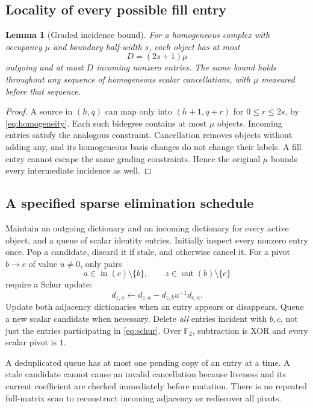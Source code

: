 \documentclass[11pt,letterpaper]{article}
\newtheorem{lemma}[theorem]{Lemma}
\theoremstyle{remark}\newtheorem{remark}[theorem]{Remark}
\newcommand{\F}{\mathbb F}
\begin{document}
\subsection{Locality of every possible fill entry}
\begin{lemma}[Graded incidence bound]\label{lem:incidence}
For a homogeneous complex with occupancy $\mu$ and boundary half-width $s$, each object has at most
\begin{equation}\label{eq:D}
 D=(2s+1)\mu
\end{equation}
outgoing and at most $D$ incoming nonzero entries. The same bound holds throughout any sequence of homogeneous scalar cancellations, with $\mu$ measured before that sequence.
\end{lemma}
\begin{proof}
A source in $(h,q)$ can map only into $(h+1,q+r)$ for $0\le r\le2s$, by \eqref{eq:homogeneity}. Each such bidegree contains at most $\mu$ objects. Incoming entries satisfy the analogous constraint. Cancellation removes objects without adding any, and its homogeneous basis changes do not change their labels. A fill entry cannot escape the same grading constraints. Hence the original $\mu$ bounds every intermediate incidence as well.
\end{proof}

\subsection{A specified sparse elimination schedule}
Maintain an outgoing dictionary and an incoming dictionary for every active object, and a queue of scalar identity entries. Initially inspect every nonzero entry once. Pop a candidate, discard it if stale, and otherwise cancel it. For a pivot $b\to c$ of value $u\ne0$, only pairs
\[
 a\in\operatorname{in}(c)\setminus\{b\},\qquad
 z\in\operatorname{out}(b)\setminus\{c\}
\]
require a Schur update:
\begin{equation}\label{eq:schur}
 d_{z,a}\longleftarrow d_{z,a}-d_{z,b}u^{-1}d_{c,a}.
\end{equation}
Update both adjacency dictionaries when an entry appears or disappears. Queue a new scalar candidate when necessary. Delete \emph{all} entries incident with $b,c$, not just the entries participating in \eqref{eq:schur}. Over $\F_2$, subtraction is XOR and every scalar pivot is $1$.

A deduplicated queue has at most one pending copy of an entry at a time. A stale candidate cannot cause an invalid cancellation because liveness and its current coefficient are checked immediately before mutation. There is no repeated full-matrix scan to reconstruct incoming adjacency or rediscover all pivots.
\end{document}
